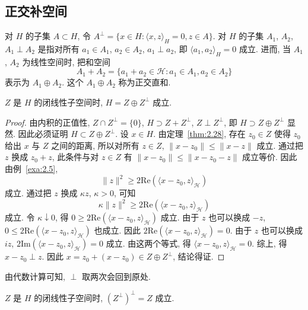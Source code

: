 \subsection*{正交补空间}

对 $H$ 的子集 $A \subset H$, 令 $A^{\perp} = \{x \in H : \langle x, z \rangle_{H} = 0, z \in A\}$. 对 $H$ 的子集 $A_{1}$, $A_{2}$, $A_{1} \perp A_{2}$ 是指对所有 $a_{1} \in A_{1}$, $a_{2} \in A_{2}$, $a_{1} \perp a_{2}$, 即 $\langle a_{1}, a_{2} \rangle_{H} = 0$ 成立. 进而, 当 $A_{1}$, $A_{2}$ 为线性空间时, 把和空间
\[
A_{1} + A_{2} = \{a_{1} + a_{2} \in \mathcal{H} : a_{1} \in A_{1}, a_{2} \in A_{2}\}
\]
表示为 $A_{1} \oplus A_{2}$. 这个 $A_{1} \oplus A_{2}$ 称为正交直和.

\begin{theorem}\label{thm:2.29}
$Z$ 是 $H$ 的闭线性子空间时, $H = Z \oplus Z^{\perp}$ 成立.
\end{theorem}

\begin{proof}
由内积的正值性, $Z \cap Z^{\perp} = \{0\}$, $H \supset Z + Z^{\perp}$, $Z \perp Z^{\perp}$, 即 $H \supset Z \oplus Z^{\perp}$ 显然. 因此必须证明 $H \subset Z \oplus Z^{\perp}$. 设 $x \in H$. 由定理~\ref{thm:2.28}, 存在 $z_{0} \in Z$ 使得 $z_{0}$ 给出 $x$ 与 $Z$ 之间的距离, 所以对所有 $z \in Z$, $\|x - z_{0}\| \leq \|x - z\|$ 成立. 通过把 $z$ 换成 $z_{0} + z$, 此条件与对 $z \in Z$ 有 $\|x - z_{0}\| \leq \|x - z_{0} - z\|$ 成立等价. 因此由例~\ref{exa:2.5},
\[
\|z\|^{2} \geq 2\mathrm{Re}(\langle x - z_{0}, z \rangle_{\mathcal{H}})
\]
成立. 通过把 $z$ 换成 $\kappa z$, $\kappa > 0$, 可知
\[
\kappa\|z\|^{2} \geq 2\mathrm{Re}(\langle x - z_{0}, z \rangle_{\mathcal{H}})
\]
成立. 令 $\kappa \downarrow 0$, 得 $0 \geq 2\mathrm{Re}(\langle x - z_{0}, z \rangle_{\mathcal{H}})$ 成立. 由于 $z$ 也可以换成 $-z$, $0 \leq 2\mathrm{Re}(\langle x - z_{0}, z \rangle_{\mathcal{H}})$ 也成立. 因此 $2\mathrm{Re}(\langle x - z_{0}, z \rangle_{\mathcal{H}}) = 0$. 由于 $z$ 也可以换成 $iz$, $2\mathrm{Im}(\langle x - z_{0}, z \rangle_{\mathcal{H}}) = 0$ 成立. 由这两个等式, 得 $\langle x - z_{0}, z \rangle_{\mathcal{H}} = 0$. 综上, 得 $x - z_{0} \perp z$. 因此 $x = z_{0} + (x - z_{0}) \in Z \oplus Z^{\perp}$, 结论得证.
\end{proof}

由代数计算可知, $\perp$ 取两次会回到原处.

\begin{corollary}\label{cor:2.1}
$Z$ 是 $H$ 的闭线性子空间时, $(Z^{\perp})^{\perp} = Z$ 成立.
\end{corollary}

